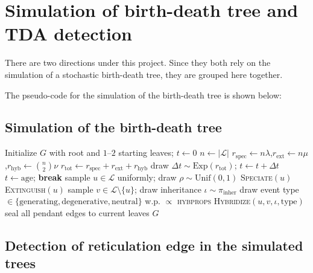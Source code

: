 \chapter{Simulation of birth-death tree and TDA detection}

There are two directions under this project. Since they both rely on the simulation of a stochastic birth-death tree, they are grouped here together.

The pseudo-code for the simulation of the birth-death tree is shown below:
\section{Simulation of the birth-death tree}
\begin{algorithm}[H]
\caption{Birth--Death--Hybridization (BDH) simulation}
\begin{algorithmic}[1]
\State Initialize $G$ with root and $1$--$2$ starting leaves; $t \gets 0$
    \State $n \gets |\mathcal{L}|$
    \State $r_{\text{spec}} \gets n\lambda$,\quad $r_{\text{ext}} \gets n\mu$,\quad $r_{\text{hyb}} \gets \binom{n}{2}\nu$
    \State $r_{\text{tot}} \gets r_{\text{spec}} + r_{\text{ext}} + r_{\text{hyb}}$
    \State draw $\Delta t \sim \text{Exp}(r_{\text{tot}})$; \quad $t \gets t + \Delta t$
        \State $t \gets \text{age}$; \textbf{break}
    \EndIf
    \State sample $u \in \mathcal{L}$ uniformly; draw $\rho \sim \text{Unif}(0,1)$
        \State \textsc{Speciate}$(u)$ 
        \State \textsc{Extinguish}$(u)$ 
    \Else
        \State sample $v \in \mathcal{L} \setminus \{u\}$; draw inheritance $\iota \sim \pi_{\text{inher}}$
        \State draw event type $\in \{\text{generating}, \text{degenerative}, \text{neutral}\}$ w.p. $\propto$ \textsc{hybprops}
        \State \textsc{Hybridize}$(u, v, \iota, \text{type})$ 
    \EndIf
\EndWhile
\State seal all pendant edges to current leaves
\State \Return $G$
\end{algorithmic}
\end{algorithm}

\section{Detection of reticulation edge in the simulated trees}

